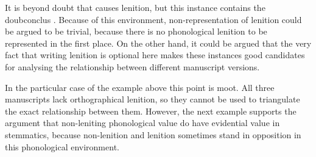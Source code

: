 
\begin{mwl}
\end{mwl}

It is beyond doubt that  causes lenition, but this instance contains the \gls{doubconclus} . Because of this environment, non-representation of lenition could be argued to be trivial, because there is no phonological lenition to be represented in the first place. On the other hand, it could be argued that the very fact that writing lenition is optional here makes these instances good candidates for analysing the relationship between different manuscript versions.

In the particular case of the example above this point is moot. All three manuscripts lack orthographical lenition, so they cannot be used to triangulate the exact relationship between them. However, the next example supports the argument that non-leniting phonological value do have evidential value in stemmatics, because non-lenition and lenition sometimes stand in opposition in this phonological environment.

